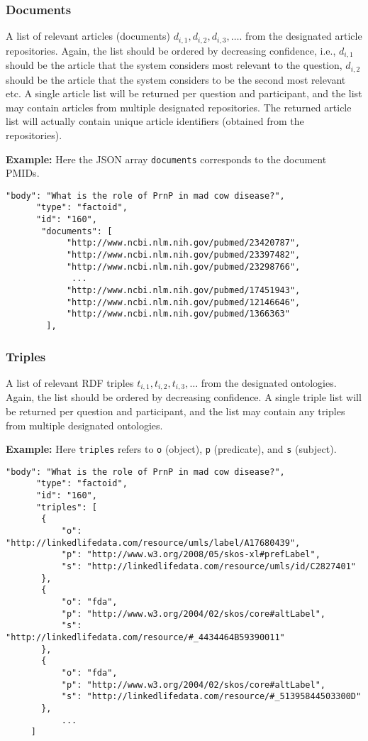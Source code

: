\subsubsection{Documents}
\begin{displayquote}
A list of relevant articles (documents) $d_{i,1}, d_{i,2}, d_{i,3}, \dots$. from the designated article repositories. Again, the list should be ordered by decreasing confidence, i.e., $d_{i,1}$ should be the article that the system considers most relevant to the question, $d_{i,2}$ should be the article that the system considers to be the second most relevant etc. A single article list will be returned per question and participant, and the list may contain articles from multiple designated repositories. The returned article list will actually contain unique article identifiers (obtained from the repositories).
\end{displayquote}
\textbf{Example:} 
Here the JSON array \verb|documents| corresponds to the document PMIDs.
\begin{verbatim}
"body": "What is the role of PrnP in mad cow disease?", 
      "type": "factoid", 
      "id": "160", 
       "documents": [
            "http://www.ncbi.nlm.nih.gov/pubmed/23420787", 
            "http://www.ncbi.nlm.nih.gov/pubmed/23397482", 
            "http://www.ncbi.nlm.nih.gov/pubmed/23298766",
             ... 
            "http://www.ncbi.nlm.nih.gov/pubmed/17451943", 
            "http://www.ncbi.nlm.nih.gov/pubmed/12146646", 
            "http://www.ncbi.nlm.nih.gov/pubmed/1366363"
        ], 
\end{verbatim}
\subsubsection{Triples}
\begin{displayquote}
A list of relevant RDF triples $t_{i,1} , t_{i,2}, t_{i,3}, \dots$ from the designated ontologies. Again, the list should be ordered by decreasing confidence. A single triple list will be returned per question and participant, and the list may contain any triples from multiple designated ontologies.
\end{displayquote}
\textbf{Example:} Here \verb|triples| refers to \verb|o| (object), \verb|p| (predicate), and \verb|s| (subject).
\begin{verbatim}
"body": "What is the role of PrnP in mad cow disease?", 
      "type": "factoid", 
      "id": "160", 
      "triples": [
       {
           "o": "http://linkedlifedata.com/resource/umls/label/A17680439", 
           "p": "http://www.w3.org/2008/05/skos-xl#prefLabel", 
           "s": "http://linkedlifedata.com/resource/umls/id/C2827401"
       }, 
       {
           "o": "fda", 
           "p": "http://www.w3.org/2004/02/skos/core#altLabel", 
           "s": "http://linkedlifedata.com/resource/#_4434464B59390011"
       }, 
       {
           "o": "fda", 
           "p": "http://www.w3.org/2004/02/skos/core#altLabel", 
           "s": "http://linkedlifedata.com/resource/#_51395844503300D"
       }, 
           ...
     ]
\end{verbatim}

